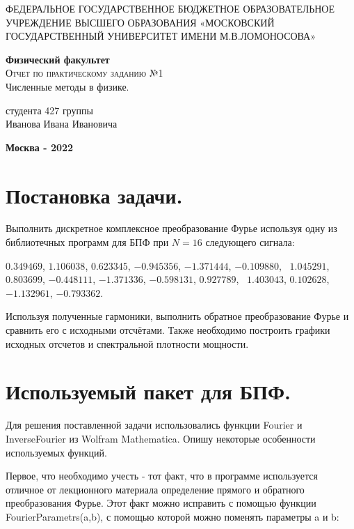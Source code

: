 \documentclass[diploma]{nanolab2015}
\begin{document}
\begin{titlepage}
\begin{center}
    \large
    ФЕДЕРАЛЬНОЕ ГОСУДАРСТВЕННОЕ БЮДЖЕТНОЕ ОБРАЗОВАТЕЛЬНОЕ УЧРЕЖДЕНИЕ ВЫСШЕГО ОБРАЗОВАНИЯ «МОСКОВСКИЙ ГОСУДАРСТВЕННЫЙ УНИВЕРСИТЕТ ИМЕНИ М.В.ЛОМОНОСОВА»
     
    \textbf{Физический факультет}\\
    \vspace{4cm}
    \textsc{\Large Отчет по практическому заданию №1}\\[5mm]
    {\LARGE Численные методы в физике.}
\end{center}
\vspace{7cm}
\null
\begin{flushright}
\normalsize студента 427 группы
\\Иванова Ивана Ивановича
\end{flushright}
\vfill
\begin{center}
\textbf{Москва - 2022}
\end{center}
\end{titlepage}


\section{Постановка задачи.}

Выполнить дискретное комплексное преобразование Фурье используя одну из библиотечных программ для БПФ при $N=16$ следующего сигнала:

\noindent $0.349469$, $1.106038$, $0.623345$, $-0.945356$, $-1.371444$, $-0.109880$, \
$1.045291$, $0.803699$, $-0.448111$, $-1.371336$, $-0.598131$, $0.927789$, \
$1.403043$, $0.102628$, $-1.132961$, $-0.793362$.

Используя полученные гармоники,  выполнить  обратное  преобразование  Фурье  и  сравнить  его с  исходными отсчётами. Также необходимо построить графики исходных отсчетов и спектральной плотности мощности.

\section{Используемый пакет для БПФ.}

Для решения поставленной задачи использовались функции Fourier и InverseFourier из Wolfram Mathematica. Опишу некоторые особенности используемых функций.

Первое, что необходимо учесть - тот факт, что в программе используется отличное от лекционного материала определение прямого и обратного преобразования Фурье. Этот факт можно исправить с помощью функции FourierParametrs(a,b), с помощью которой можно поменять параметры a и b:
\end{document}
